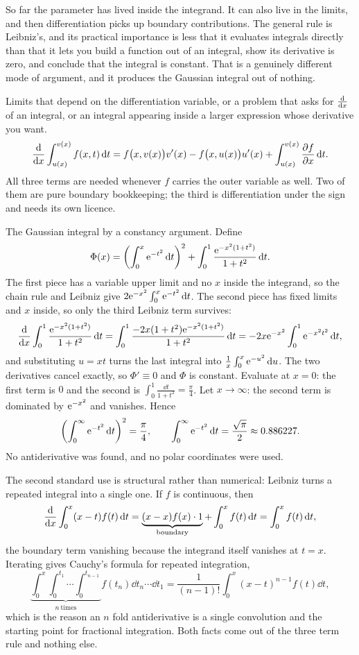 So far the parameter has lived inside the integrand. It can also live in the limits, and then differentiation picks up boundary contributions. The general rule is Leibniz's, and its practical importance is less that it evaluates integrals directly than that it lets you build a function out of an integral, show its derivative is zero, and conclude that the integral is constant. That is a genuinely different mode of argument, and it produces the Gaussian integral out of nothing.

\cue Limits that depend on the differentiation variable, or a problem that asks for $\frac{\mathrm{d}}{\mathrm{d}x}$ of an integral, or an integral appearing inside a larger expression whose derivative you want.
\method
\[\frac{\mathrm{d}}{\mathrm{d}x}\int_{u(x)}^{v(x)}f(x,t)\,\mathrm{d} t=f\bigl(x,v(x)\bigr)v'(x)-f\bigl(x,u(x)\bigr)u'(x)+\int_{u(x)}^{v(x)}\frac{\partial f}{\partial x}\,\mathrm{d} t.\]
All three terms are needed whenever $f$ carries the outer variable as well. Two of them are pure boundary bookkeeping; the third is differentiation under the sign and needs its own licence.

\begin{worked}
The Gaussian integral by a constancy argument. Define
\[\Phi(x)=\left(\int_0^{x}\mathrm{e}^{-t^{2}}\,\mathrm{d} t\right)^{2}+\int_0^{1}\frac{\mathrm{e}^{-x^{2}(1+t^{2})}}{1+t^{2}}\,\mathrm{d} t.\]
The first piece has a variable upper limit and no $x$ inside the integrand, so the chain rule and Leibniz give $2\mathrm{e}^{-x^{2}}\int_0^x\mathrm{e}^{-t^{2}}\,\mathrm{d} t$. The second piece has fixed limits and $x$ inside, so only the third Leibniz term survives:
\[\frac{\mathrm{d}}{\mathrm{d}x}\int_0^1\frac{\mathrm{e}^{-x^{2}(1+t^{2})}}{1+t^{2}}\,\mathrm{d} t=\int_0^1\frac{-2x(1+t^{2})\mathrm{e}^{-x^{2}(1+t^{2})}}{1+t^{2}}\,\mathrm{d} t=-2x\mathrm{e}^{-x^{2}}\int_0^1 \mathrm{e}^{-x^{2}t^{2}}\,\mathrm{d} t,\]
and substituting $u=xt$ turns the last integral into $\tfrac1x\int_0^x \mathrm{e}^{-u^{2}}\,\mathrm{d} u$. The two derivatives cancel exactly, so $\Phi'\equiv0$ and $\Phi$ is constant. Evaluate at $x=0$: the first term is $0$ and the second is $\int_0^1\frac{\dd t}{1+t^{2}}=\tfrac{\pi}{4}$. Let $x\to\infty$: the second term is dominated by $\mathrm{e}^{-x^{2}}$ and vanishes. Hence
\[\left(\int_0^{\infty}\mathrm{e}^{-t^{2}}\,\mathrm{d} t\right)^{2}=\frac{\pi}{4},\qquad \int_0^{\infty}\mathrm{e}^{-t^{2}}\,\mathrm{d} t=\frac{\sqrt{\pi}}{2}\approx0.886227.\]
No antiderivative was found, and no polar coordinates were used.
\end{worked}

The second standard use is structural rather than numerical: Leibniz turns a repeated integral into a single one. If $f$ is continuous, then
\[\frac{\mathrm{d}}{\mathrm{d}x}\int_0^{x}(x-t)f(t)\,\mathrm{d} t=\underbrace{(x-x)f(x)\cdot1}_{\text{boundary}}+\int_0^{x}f(t)\,\mathrm{d} t=\int_0^{x}f(t)\,\mathrm{d} t,\]
the boundary term vanishing because the integrand itself vanishes at $t=x$. Iterating gives Cauchy's formula for repeated integration,
\[\underbrace{\int_0^{x}\!\!\int_0^{t_1}\!\!\cdots\int_0^{t_{n-1}}}_{n\ \text{times}}f(t_n)\dd t_n\cdots\dd t_1=\frac{1}{(n-1)!}\int_0^{x}(x-t)^{n-1}f(t)\dd t,\]
which is the reason an $n$ fold antiderivative is a single convolution and the starting point for fractional integration. Both facts come out of the three term rule and nothing else.

